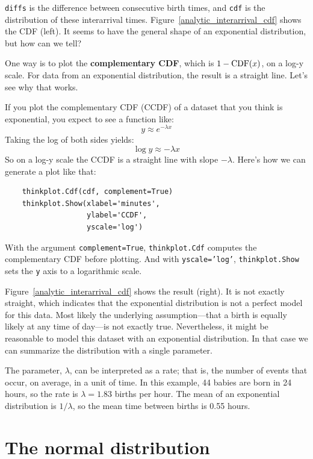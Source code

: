 \documentclass[12pt]{book}
\begin{document}
{\tt diffs} is the difference between consecutive birth times, and
{\tt cdf} is the distribution of these interarrival times.
Figure~\ref{analytic_interarrival_cdf} shows the CDF (left).  It seems
to have the general shape of an exponential distribution, but how can
we tell?

One way is to plot the {\bf complementary CDF}, which is $1 - \mathrm{CDF}(x)$,
on a log-y scale.  For data from an exponential distribution, the
result is a straight line.  Let's see why that works.
  

If you plot the complementary CDF (CCDF) of a dataset that you think is
exponential, you expect to see a function like:
%
\[ y \approx e^{-\lambda x} \]
%
Taking the log of both sides yields:
%
\[ \log y \approx -\lambda x\]
%
So on a log-y scale the CCDF is a straight line
with slope $-\lambda$.  Here's how we can generate a plot like that:


\begin{verbatim}
    thinkplot.Cdf(cdf, complement=True)
    thinkplot.Show(xlabel='minutes',
                   ylabel='CCDF',
                   yscale='log')
\end{verbatim}

With the argument {\tt complement=True}, {\tt thinkplot.Cdf} computes
the complementary CDF before plotting.  And with {\tt yscale='log'},
{\tt thinkplot.Show} sets the {\tt y} axis to a logarithmic scale.

Figure~\ref{analytic_interarrival_cdf} shows the result (right).  It is not
exactly straight, which indicates that the exponential distribution is
not a perfect model for this data.  Most likely the underlying
assumption---that a birth is equally likely at any time of day---is
not exactly true.  Nevertheless, it might be reasonable to model this
dataset with an exponential distribution.  In that case we can
summarize the distribution with a single parameter.

The parameter, $\lambda$, can be interpreted as a rate; that is, the
number of events that occur, on average, in a unit of time.  In this
example, 44 babies are born in 24 hours, so the rate is $\lambda =
1.83$ births per hour.  The mean of an exponential distribution is
$1/\lambda$, so the mean time between births is 0.55 hours.


\section{The normal distribution}
\label{normal}
\end{document}
